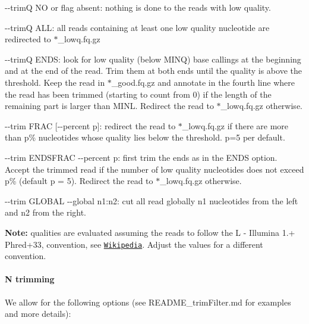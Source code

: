 \begin{DoxyItemize}
\item {\ttfamily -\/-\/trimQ NO} or flag absent\+: nothing is done to the reads with low quality.
\item {\ttfamily -\/-\/trimQ A\+LL}\+: all reads containing at least one low quality nucleotide are redirected to {\ttfamily $\ast$\+\_\+lowq.fq.\+gz}
\item {\ttfamily -\/-\/trimQ E\+N\+DS}\+: look for low quality (below M\+I\+NQ) base callings at the beginning and at the end of the read. Trim them at both ends until the quality is above the threshold. Keep the read in {\ttfamily $\ast$\+\_\+good.fq.\+gz} and annotate in the fourth line where the read has been trimmed (starting to count from 0) if the length of the remaining part is larger than {\ttfamily M\+I\+NL}. Redirect the read to {\ttfamily $\ast$\+\_\+lowq.fq.\+gz} otherwise.
\item {\ttfamily -\/-\/trim F\+R\+AC \mbox{[}-\/-\/percent p\mbox{]}}\+: redirect the read to {\ttfamily $\ast$\+\_\+lowq.fq.\+gz} if there are more than {\ttfamily p\%} nucleotides whose quality lies below the threshold. {\ttfamily p=5} per default.
\item {\ttfamily -\/-\/trim E\+N\+D\+S\+F\+R\+AC -\/-\/percent p}\+: first trim the ends as in the {\ttfamily E\+N\+DS} option. Accept the trimmed read if the number of low quality nucleotides does not exceed {\ttfamily p\%} (default {\ttfamily p = 5}). Redirect the read to {\ttfamily $\ast$\+\_\+lowq.fq.\+gz} otherwise.
\item {\ttfamily -\/-\/trim G\+L\+O\+B\+AL -\/-\/global n1\+:n2}\+: cut all read globally {\ttfamily n1} nucleotides from the left and {\ttfamily n2} from the right.
\end{DoxyItemize}

{\bfseries Note\+:} qualities are evaluated assuming the reads to follow the L -\/ Illumina 1.+ Phred+33, convention, see \href{https://en.wikipedia.org/wiki/FASTQ_format#Encoding}{\tt Wikipedia}. Adjust the values for a different convention.

\paragraph*{N trimming}

We allow for the following options (see R\+E\+A\+D\+M\+E\+\_\+trim\+Filter.\+md for examples and more details)\+:


